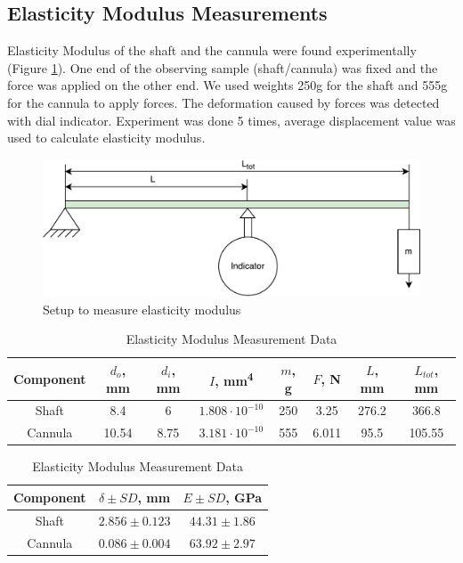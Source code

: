 	\subsection{Elasticity Modulus Measurements}
	\label{sec:ElasMod}
	Elasticity Modulus of the shaft and the cannula were found experimentally (Figure \ref{fig:ElasModSet}). One end of the observing sample (shaft/cannula) was fixed and the force was applied on the other end. We used weights 250g for the shaft and 555g for the cannula to apply forces. The deformation caused by forces was detected with dial indicator. Experiment was done 5 times, average displacement value was used to calculate elasticity modulus.
	
\begin{figure}[h]
	\begin{center}
		\includegraphics[width=120mm]{fig/methods/el_mod_set.pdf}
	\end{center}
	\vspace{-4mm}
	\caption[Setup to measure elasticity modulus]
	{Setup to measure elasticity modulus}
	\label{fig:ElasModSet}
	\vspace{-2mm}
\end{figure}

\begin{table}
\caption {Elasticity Modulus Measurement Data} \label{tab:elasMod} 
\begin{tabular}{ | c | c | c | c | c | c | c | c | } 
\hline
Component & $d_o$, mm & $d_i$, mm & $I$, mm\textsuperscript{4} & $m$, g & $F$, N & $L$, mm & $L_{tot}$, mm \\ 
\hline
Shaft & 8.4 & 6 & $1.808 \cdot 10^{-10}$ & 250 & 3.25 & 276.2 & 366.8\\ 
\hline
Cannula & 10.54 & 8.75 & $3.181 \cdot 10^{-10}$ & 555 & 6.011 & 95.5 & 105.55 \\ 
\hline
\end{tabular}

\begin{tabular}{ | c | c | c | } 
\hline
Component & $\delta \pm SD$, mm & $E \pm SD$, GPa \\ 
\hline
Shaft & $2.856 \pm 0.123$ & $44.31 \pm 1.86$ \\ 
\hline
Cannula & $0.086 \pm 0.004$ & $63.92 \pm 2.97$ \\ 
\hline
\end{tabular}
\end{table}

